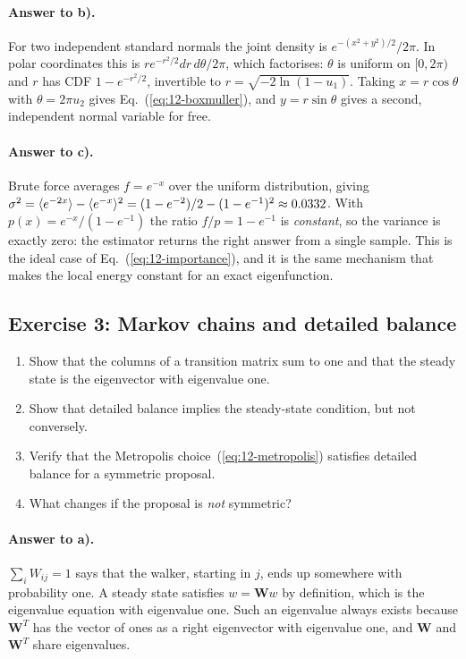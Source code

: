 \paragraph{Answer to b).}
For two independent standard normals the joint density is
$e^{-(x^2+y^2)/2}/2\pi$.  In polar coordinates this is
$re^{-r^2/2}dr\,d\theta/2\pi$, which factorises: $\theta$ is uniform on
$[0,2\pi)$ and $r$ has CDF $1-e^{-r^2/2}$, invertible to
$r=\sqrt{-2\ln(1-u_1)}$.  Taking $x=r\cos\theta$ with $\theta=2\pi u_2$ gives
Eq.~(\ref{eq:12-boxmuller}), and $y=r\sin\theta$ gives a second, independent
normal variable for free.

\paragraph{Answer to c).}
Brute force averages $f=e^{-x}$ over the uniform distribution, giving
$\sigma^2=\langle e^{-2x} \rangle-\langle e^{-x} \rangle^2
=(1-e^{-2})/2-(1-e^{-1})^2\approx0.0332$.  With
$p(x)=e^{-x}/(1-e^{-1})$ the ratio $f/p=1-e^{-1}$ is \emph{constant}, so the
variance is exactly zero: the estimator returns the right answer from a single
sample.  This is the ideal case of Eq.~(\ref{eq:12-importance}), and it is the
same mechanism that makes the local energy constant for an exact
eigenfunction.

\subsection*{Exercise 3: Markov chains and detailed balance}
\label{ex:12-markov}

\begin{enumerate}
  \item[a)] Show that the columns of a transition matrix sum to one and that
  the steady state is the eigenvector with eigenvalue one.
  \item[b)] Show that detailed balance implies the steady-state condition,
  but not conversely.
  \item[c)] Verify that the Metropolis choice~(\ref{eq:12-metropolis})
  satisfies detailed balance for a symmetric proposal.
  \item[d)] What changes if the proposal is \emph{not} symmetric?
\end{enumerate}

\paragraph{Answer to a).}
$\sum_i W_{ij}=1$ says that the walker, starting in $j$, ends up somewhere
with probability one.  A steady state satisfies $w=\bm{W}w$ by definition,
which is the eigenvalue equation with eigenvalue one.  Such an eigenvalue
always exists because $\bm{W}^{T}$ has the vector of ones as a right
eigenvector with eigenvalue one, and $\bm{W}$ and $\bm{W}^{T}$ share
eigenvalues.

